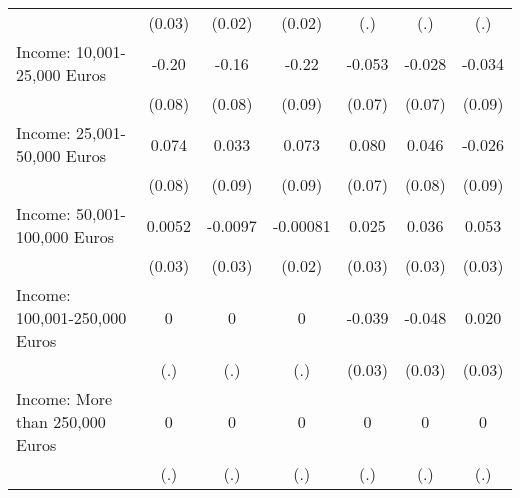 {\begin{tabular}{l*{6}{c}}
            &      (0.03)         &      (0.02)         &      (0.02)         &         (.)         &         (.)         &         (.)         \\
\addlinespace
Income: 10,001-25,000 Euros&       -0.20\sym{**} &       -0.16         &       -0.22\sym{*}  &      -0.053         &      -0.028         &      -0.034         \\
            &      (0.08)         &      (0.08)         &      (0.09)         &      (0.07)         &      (0.07)         &      (0.09)         \\
\addlinespace
Income: 25,001-50,000 Euros&       0.074         &       0.033         &       0.073         &       0.080         &       0.046         &      -0.026         \\
            &      (0.08)         &      (0.09)         &      (0.09)         &      (0.07)         &      (0.08)         &      (0.09)         \\
\addlinespace
Income: 50,001-100,000 Euros&      0.0052         &     -0.0097         &    -0.00081         &       0.025         &       0.036         &       0.053         \\
            &      (0.03)         &      (0.03)         &      (0.02)         &      (0.03)         &      (0.03)         &      (0.03)         \\
\addlinespace
Income: 100,001-250,000 Euros&           0         &           0         &           0         &      -0.039         &      -0.048         &       0.020         \\
            &         (.)         &         (.)         &         (.)         &      (0.03)         &      (0.03)         &      (0.03)         \\
\addlinespace
Income: More than 250,000 Euros&           0         &           0         &           0         &           0         &           0         &           0         \\
            &         (.)         &         (.)         &         (.)         &         (.)         &         (.)         &         (.)         \\
\bottomrule
\end{tabular}
}
